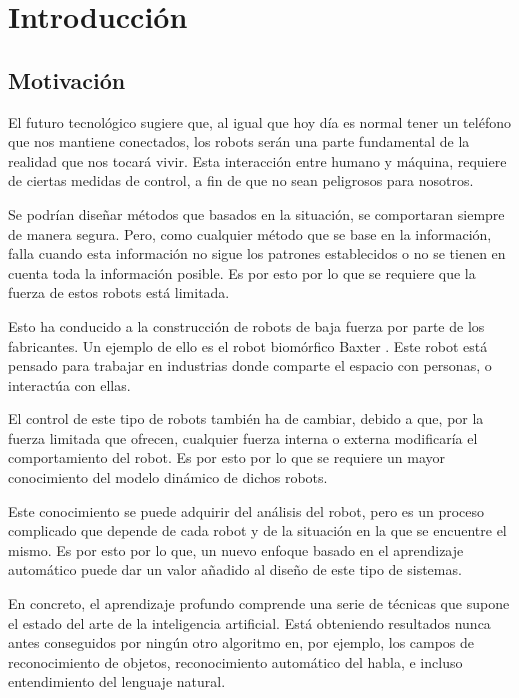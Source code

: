 \chapter{Introducción}
\section{Motivación}
El futuro tecnológico sugiere que, al igual que hoy día es normal tener un teléfono que nos mantiene conectados, los robots serán una parte fundamental de la realidad que nos tocará vivir. Esta interacción entre humano y máquina, requiere de ciertas medidas de control, a fin de que no sean peligrosos para nosotros.

Se podrían diseñar métodos que basados en la situación, se comportaran siempre de manera segura. Pero, como cualquier método que se base en la información, falla cuando esta información no sigue los patrones establecidos o no se tienen en cuenta toda la información posible. Es por esto por lo que se requiere que la fuerza de estos robots está limitada.

Esto ha conducido a la construcción de robots de baja fuerza por parte de los fabricantes. Un ejemplo de ello es el robot biomórfico Baxter \cite{baxter}. Este robot está pensado para trabajar en industrias donde comparte el espacio con personas, o interactúa con ellas.

El control de este tipo de robots \cite{kulakowski2007dynamic}\cite{brosilow2002techniques}\cite{tolu2013adaptive}\cite{tolu2012bio}  también ha de cambiar, debido a que, por la fuerza limitada que ofrecen, cualquier fuerza interna o externa modificaría el comportamiento del robot. Es por esto por lo que se requiere un mayor conocimiento del modelo dinámico de dichos robots.

Este conocimiento se puede adquirir del análisis del robot, pero es un proceso complicado que depende de cada robot y de la situación en la que se encuentre el mismo. Es por esto por lo que, un nuevo enfoque basado en el aprendizaje automático \cite{andrewng}\cite{abu2012learning} puede dar un valor añadido al diseño de este tipo de sistemas.

En concreto, el aprendizaje profundo \cite{udacitydeeplearning}\cite{hinton} comprende una serie de técnicas que supone el estado del arte de la inteligencia artificial. Está obteniendo resultados nunca antes conseguidos por ningún otro algoritmo en, por ejemplo, los campos de reconocimiento de objetos, reconocimiento automático del habla, e incluso entendimiento del lenguaje natural.

